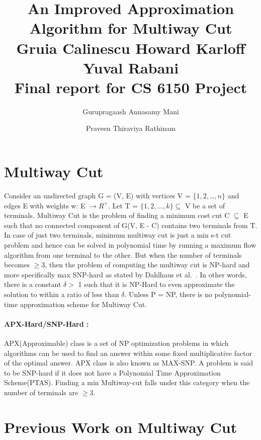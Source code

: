 \documentclass[11pt]{article}
\title{An Improved Approximation Algorithm for Multiway Cut\\Gruia Calinescu Howard Karloﬀ Yuval Rabani\\Final report for CS 6150 Project}
\author{Gurupragaash Annasamy Mani \and Praveen Thiraviya Rathinam}
\begin{document}
\maketitle

\section{Multiway Cut}
Consider an undirected graph G = (V, E) with vertices V = $\{1, 2, $\dots$, n\}$ and edges E with weights w: E $\rightarrow R^{+}$. Let T = $\{1, 2, . . . , k\} \subseteq$ V be a set of terminals. Multiway Cut is the problem of finding a minimum cost cut C $\subseteq$ E such that no connected component of G(V, E - C) contains two terminals from T. In case of just two terminals, minimum multiway cut is just a min s-t cut problem and hence can be solved in polynomial time by running a maximum flow algorithm from one terminal to the other. But when the number of terminals becomes $\ge 3$, then the problem of computing the multiway cut is NP-hard and more specifically max SNP-hard as stated by Dahlhaus et al.~\cite{Dahlhaus}. In other words, there is a constant $\delta >$ 1 such that it is NP-Hard to even approximate the solution to within a ratio of less than $\delta$. Unless P = NP, there is no polynomial-time approximation scheme for Multiway Cut.
\paragraph{APX-Hard/SNP-Hard :}
APX(Approximable) class is a set of NP optimization problems in which algorithms can be used to find an answer within some fixed multiplicative factor of the optimal answer. APX class is also known as MAX-SNP. A problem is said to be SNP-hard if it does not have a Polynomial Time Approximation Scheme(PTAS). Finding a min Multiway-cut falls under this category when the number of terminals are $\ge 3$.
 
\section{Previous Work on Multiway Cut} 
\end{document}
